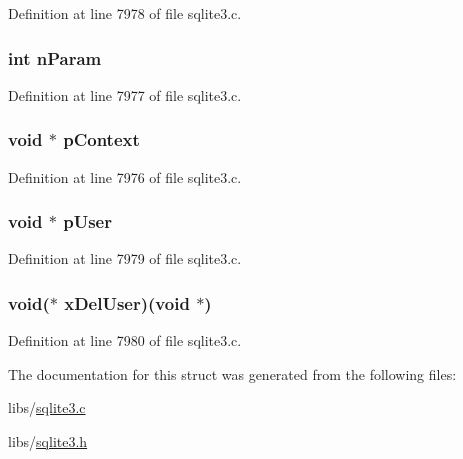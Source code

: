 Definition at line 7978 of file sqlite3.\+c.

\hypertarget{structsqlite3__rtree__geometry_ab3346bd10d8072caf8ec019ceeb3224e}{}
\subsubsection[{n\+Param}]{\setlength{\rightskip}{0pt plus 5cm}int n\+Param}\label{structsqlite3__rtree__geometry_ab3346bd10d8072caf8ec019ceeb3224e}


Definition at line 7977 of file sqlite3.\+c.

\hypertarget{structsqlite3__rtree__geometry_a421c653f7747c70d1e422f06b75e7f53}{}
\subsubsection[{p\+Context}]{\setlength{\rightskip}{0pt plus 5cm}void $\ast$ p\+Context}\label{structsqlite3__rtree__geometry_a421c653f7747c70d1e422f06b75e7f53}


Definition at line 7976 of file sqlite3.\+c.

\hypertarget{structsqlite3__rtree__geometry_a6ffcfefabc1d53128f66ef895058a6e2}{}
\subsubsection[{p\+User}]{\setlength{\rightskip}{0pt plus 5cm}void $\ast$ p\+User}\label{structsqlite3__rtree__geometry_a6ffcfefabc1d53128f66ef895058a6e2}


Definition at line 7979 of file sqlite3.\+c.

\hypertarget{structsqlite3__rtree__geometry_aa90fafba5714bc276f69c04adae44256}{}
\subsubsection[{x\+Del\+User}]{\setlength{\rightskip}{0pt plus 5cm}void($\ast$ x\+Del\+User)(void $\ast$)}\label{structsqlite3__rtree__geometry_aa90fafba5714bc276f69c04adae44256}


Definition at line 7980 of file sqlite3.\+c.



The documentation for this struct was generated from the following files\+:\begin{DoxyCompactItemize}
\item 
libs/\hyperlink{sqlite3_8c}{sqlite3.\+c}\item 
libs/\hyperlink{sqlite3_8h}{sqlite3.\+h}\end{DoxyCompactItemize}
